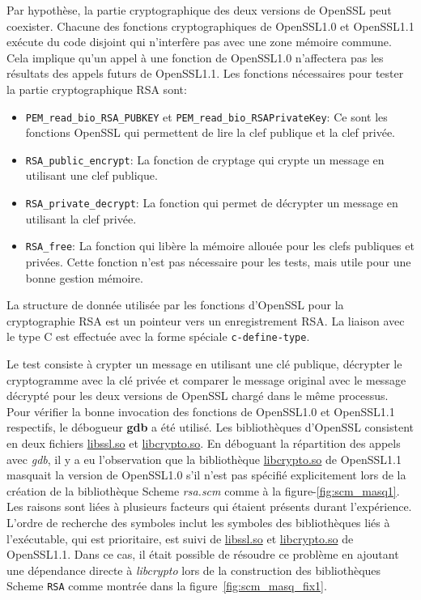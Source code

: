 Par hypothèse, la partie cryptographique des deux versions de OpenSSL peut
coexister. Chacune des fonctions cryptographiques de OpenSSL1.0 et OpenSSL1.1
exécute du code disjoint qui n'interfère pas avec une zone mémoire commune.
Cela implique qu'un appel à une fonction de OpenSSL1.0 n'affectera pas les
résultats des appels futurs de OpenSSL1.1. Les fonctions nécessaires
pour tester la partie cryptographique RSA sont:
\begin{itemize}
    \item \lstinline{PEM_read_bio_RSA_PUBKEY} et \lstinline{PEM_read_bio_RSAPrivateKey}:
        Ce sont les fonctions OpenSSL qui permettent de lire la clef publique et la clef privée.
    \item \lstinline{RSA_public_encrypt}:
        La fonction de cryptage qui crypte un  message en utilisant une clef publique.
    \item \lstinline{RSA_private_decrypt}:
        La fonction qui permet de décrypter un message en utilisant la clef privée.
    \item \lstinline{RSA_free}:
        La fonction qui libère la mémoire allouée pour les clefs publiques et privées.
        Cette fonction n'est pas nécessaire pour les tests, mais utile pour une bonne
        gestion mémoire.
\end{itemize}
La structure de donnée utilisée par les fonctions d'OpenSSL pour la cryptographie RSA
est un pointeur vers un enregistrement RSA. La liaison avec le type C est effectuée avec
la forme spéciale \lstinline{c-define-type}.

Le test consiste à crypter un message en utilisant une clé publique, décrypter
le cryptogramme avec la clé privée et comparer le message original avec le
message décrypté pour les deux versions de OpenSSL chargé dans le même
processus. Pour vérifier la bonne invocation des fonctions de OpenSSL1.0 et
OpenSSL1.1 respectifs, le débogueur \textbf{gdb} a été utilisé. Les
bibliothèques d'OpenSSL consistent en deux fichiers \url{libssl.so} et
\url{libcrypto.so}.  En déboguant la répartition des appels avec \textit{gdb},
il y a eu l'observation que la bibliothèque \url{libcrypto.so} de OpenSSL1.1
masquait la version de OpenSSL1.0 s'il n'est pas spécifié explicitement lors de
la création de la bibliothèque Scheme \textit{rsa.scm} comme à la
figure-\ref{fig:scm_masq1}. Les raisons sont liées à plusieurs facteurs qui
étaient présents durant l'expérience. L'ordre de recherche des symboles inclut
les symboles des bibliothèques liés à l'exécutable, qui est prioritaire, est
suivi de \url{libssl.so} et \url{libcrypto.so} de OpenSSL1.1.  Dans ce cas, il
était possible de résoudre ce problème en ajoutant une dépendance directe à
\textit{libcrypto} lors de la construction des bibliothèques Scheme \verb+RSA+
comme montrée dans la figure~\ref{fig:scm_masq_fix1}.

